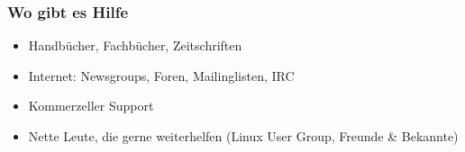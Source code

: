 \documentclass[compress]{beamer}
\begin{document}
\begin{frame}
	\frametitle{Wo gibt es Hilfe}
	\begin{itemize}
		\item Handbücher, Fachbücher, Zeitschriften
		\item Internet: Newsgroups, Foren, Mailinglisten, IRC
		\item Kommerzeller Support
		\item Nette Leute, die gerne weiterhelfen (Linux User Group, Freunde \& Bekannte)
	\end{itemize}
\end{frame}
\end{document}
